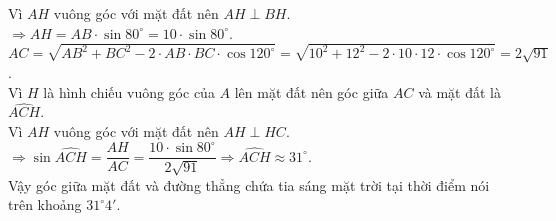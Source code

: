 \begin{ex}
{		Vì $AH$ vuông góc với mặt đất  nên $AH\perp BH$.\\
		$\Rightarrow AH=AB\cdot  \sin 80^\circ=10\cdot \sin 80^\circ$.\\
		$AC=\sqrt{AB^2+BC^2-2\cdot AB\cdot BC\cdot \cos 120^\circ}=\sqrt{10^2+12^2-2\cdot 10\cdot 12\cdot \cos 120^\circ}=2\sqrt{91}$.\\ 
		Vì $H$ là hình chiếu vuông góc của $A$ lên mặt đất nên góc giữa  $AC$ và mặt đất là $\widehat{ACH}$.\\
		Vì $AH$ vuông góc với  mặt đất nên $AH\perp HC$.\\
		$\Rightarrow \sin \widehat{ACH}=\dfrac{AH}{AC}=\dfrac{10\cdot \sin 80^\circ}{2\sqrt{91}}\Rightarrow \widehat{ACH}\approx  31^\circ$.\\
		 Vậy góc giữa mặt đất và đường thẳng chứa tia sáng mặt trời tại thời điểm nói trên khoảng $31^\circ4'$.\\
	} 
\end{ex}

